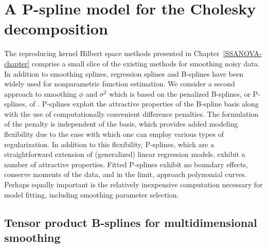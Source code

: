 
\chapter{A P-spline model for the Cholesky decomposition} \label{psplines-chapter}



The reproducing kernel Hilbert space methods presented in Chapter~\ref{SSANOVA-chapter} comprise a small slice of the existing methods for smoothing noisy data. In addition to smoothing splines, regression splines \cite{eubank1999nonparametric} and B-splines \cite{de1978practical}  have been widely used for nonparametric function estimation. We consider a second approach to smoothing $\phi$ and $\sigma^2$ which is based on the penalized B-splines, or P-splines, of \cite{eilers1996flexible}. P-splines exploit the attractive properties of the B-spline basis along with the use of computationally convenient difference penalties. The formulation of the penalty is independent of the basis, which provides added modeling flexibility due to the ease with which one can employ various types of regularization. In addition to this flexibility, P-splines, which are a straightforward extension of (generalized) linear regression models, exhibit a number of attractive properties. Fitted P-splines exhibit no boundary effects, conserve moments of the data, and in the limit, approach polynomial curves. Perhaps equally important is the relatively inexpensive computation necessary for model fitting, including smoothing parameter selection.

\section{Tensor product B-splines for multidimensional smoothing}

